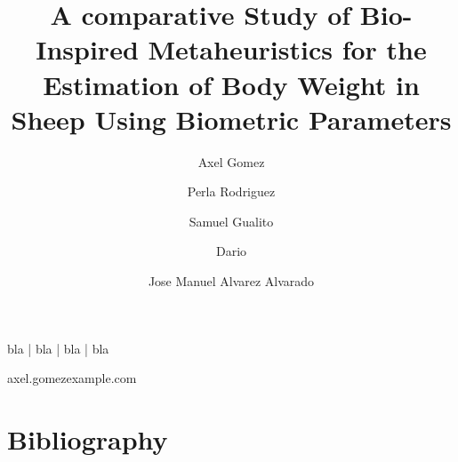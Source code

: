 \documentclass[times, twoside]{style/axelgomez-article}
\begin{document}
\title{A comparative Study of Bio-Inspired Metaheuristics
  for the Estimation of Body Weight in Sheep Using Biometric Parameters}

\author[1,\Letter]{Axel Gomez}
\author[1]{Perla Rodriguez}
\author[1]{Samuel Gualito}
\author[1]{Dario}
\author[2]{Jose Manuel Alvarez Alvarado}


\maketitle



\begin{keywords}
bla | bla | bla | bla
\end{keywords}

\begin{corrauthor}
axel.gomez\at example.com
\end{corrauthor}







\section*{Bibliography}


\onecolumn
\newpage



\end{document}
